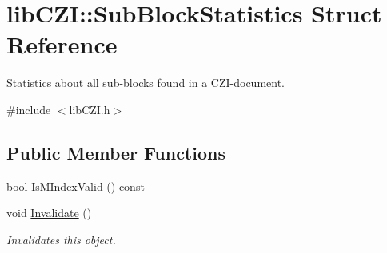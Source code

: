 \hypertarget{structlib_c_z_i_1_1_sub_block_statistics}{}\section{lib\+C\+ZI\+:\+:Sub\+Block\+Statistics Struct Reference}
\label{structlib_c_z_i_1_1_sub_block_statistics}


Statistics about all sub-\/blocks found in a C\+Z\+I-\/document.  




{\ttfamily \#include $<$lib\+C\+Z\+I.\+h$>$}

\subsection*{Public Member Functions}
\begin{DoxyCompactItemize}
\item 
bool \hyperlink{structlib_c_z_i_1_1_sub_block_statistics_a61f70e5acf237b4d4550f18dbc23b4a7}{Is\+M\+Index\+Valid} () const
\item 
\mbox{\label{structlib_c_z_i_1_1_sub_block_statistics_a3b328670c14542bec4e37763379ca319}} 
void \hyperlink{structlib_c_z_i_1_1_sub_block_statistics_a3b328670c14542bec4e37763379ca319}{Invalidate} ()
\begin{DoxyCompactList}\small\item\em Invalidates this object. \end{DoxyCompactList}\end{DoxyCompactItemize}
